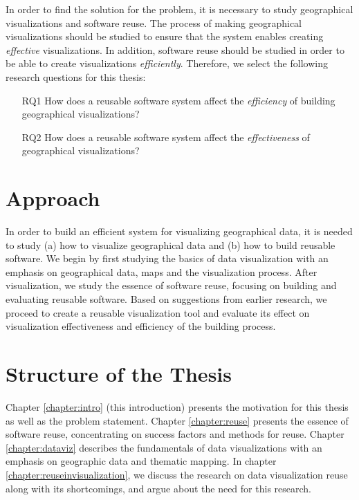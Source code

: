 In order to find the solution for the problem, it is necessary to study geographical visualizations and software reuse. The process of making geographical visualizations should be studied to ensure that the system enables creating \emph{effective} visualizations. In addition, software reuse should be studied in order to be able to create visualizations \emph{efficiently}. Therefore, we select the following research questions for this thesis:

\begin{enumerate}
	\item[RQ1] How does a reusable software system affect the \emph{efficiency} of building geographical visualizations?
	\item[RQ2] How does a reusable software system affect the \emph{effectiveness} of geographical visualizations?
\end{enumerate}



\section{Approach}

In order to build an efficient system for visualizing geographical data, it is needed to study (a) how to visualize geographical data and (b) how to build reusable software. We begin by first studying the basics of data visualization with an emphasis on geographical data, maps and the visualization process. After visualization, we study the essence of software reuse, focusing on building and evaluating reusable software. Based on suggestions from earlier research, we proceed to create a reusable visualization tool and evaluate its effect on visualization effectiveness and efficiency of the building process.

\section{Structure of the Thesis}
\label{section:structure} 

Chapter \ref{chapter:intro} (this introduction) presents the motivation for this thesis as well as the problem statement. Chapter \ref{chapter:reuse} presents the essence of software reuse, concentrating on success factors and methods for reuse. Chapter \ref{chapter:dataviz} describes the fundamentals of data visualizations with an emphasis on geographic data and thematic mapping. In chapter \ref{chapter:reuseinvisualization}, we discuss the research on data visualization reuse along with its shortcomings, and argue about the need for this research.


